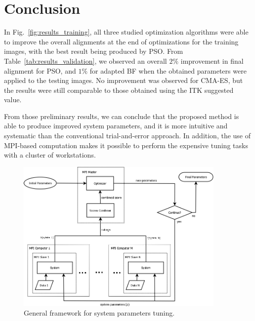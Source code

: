 \documentclass[]{spie}  %
\begin{document}
\section{Conclusion}

In Fig.~\ref{fig:results_training}, all three studied optimization algorithms were able to improve the overall alignments at the end of optimizations for the training images, with the best result being produced by PSO.
From Table~\ref{tab:results_validation}, we observed an overall $2\%$ improvement in final alignment for PSO, and $1\%$ for adapted BF when the obtained parameters were applied to the testing images. No improvement was observed for CMA-ES, but the results were still comparable to those obtained using the ITK suggested value. 

From those preliminary results, we can conclude that the proposed method is able to produce improved system parameters, and it is more intuitive and systematic than the conventional trial-and-error approach. In addition, the use of MPI-based computation makes it possible to perform the expensive tuning tasks with a cluster of workstations.

% 



\begin{figure}
\begin{center}
\includegraphics[width=4in]{framework}
\end{center}
\caption{General framework for system parameters tuning.}
\label{fig:spt_framework}
\end{figure}
\end{document}

